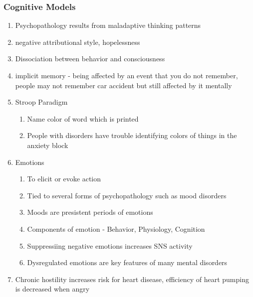 \documentclass[12pt]{article}
\begin{document}
\subsubsection{Cognitive Models}
\begin{enumerate}
\item Psychopathology results from maladaptive thinking patterns
\item negative attributional style, hopelessness
\item Dissociation between behavior and consciousness
\item implicit memory - being affected by an event that you do not
  remember, people may not remember car accident but still affected by
  it mentally
\item Stroop Paradigm
  \begin{enumerate}
  \item Name color of word which is printed
  \item People with disorders have trouble identifying colors of
    things in the anxiety block
  \end{enumerate}
\item Emotions
  \begin{enumerate}
  \item To elicit or evoke action
  \item Tied to several forms of psychopathology such as mood disorders
  \item Moods are presistent periods of emotions
  \item Components of emotion - Behavior, Physiology, Cognition
  \item Suppressiing negative emotions increases SNS activity
  \item Dysregulated emotions are key features of many mental disorders
  \end{enumerate}
\item Chronic hostility increases risk for heart disease, efficiency
  of heart pumping is decreased when angry
\end{enumerate}
\end{document}
